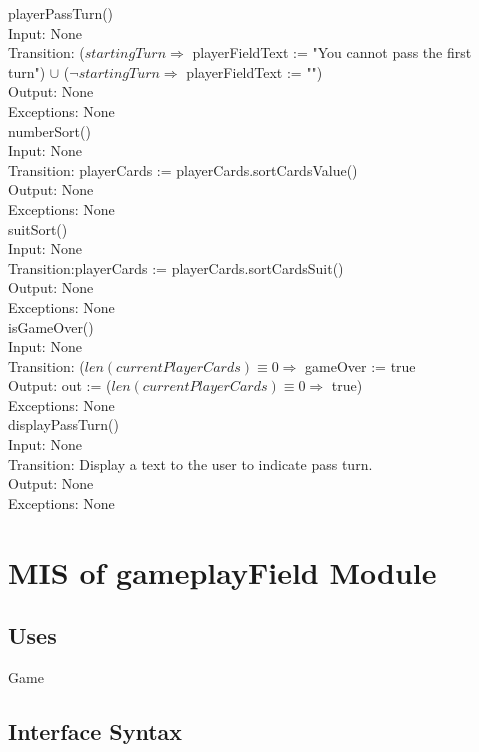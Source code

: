 \documentclass[12pt, titlepage]{article}
\begin{document}
\noindent playerPassTurn()\\
Input: None\\
Transition: ($startingTurn \Rightarrow$ playerFieldText := "You cannot pass the first turn") $\cup$ ($\neg startingTurn  \Rightarrow$ playerFieldText := "")\\
Output: None\\
Exceptions: None \\


\noindent numberSort()\\
Input: None\\
Transition: playerCards := playerCards.sortCardsValue()\\
Output: None\\
Exceptions: None \\


\noindent suitSort()\\
Input: None\\
Transition:playerCards := playerCards.sortCardsSuit() \\
Output: None\\
Exceptions: None \\

\noindent isGameOver() \\
Input: None\\
Transition: ($ len(currentPlayerCards) \equiv 0 \Rightarrow$ gameOver := true\\
Output: out := ($ len(currentPlayerCards) \equiv 0 \Rightarrow$ true)\\
Exceptions: None \\

\noindent displayPassTurn() \\
Input: None\\
Transition: Display a text to the user to indicate pass turn. \\
Output: None\\
Exceptions: None \\


\section{MIS of gameplayField Module}
\subsection{Uses}
Game
\subsection{Interface Syntax}
\end{document}
